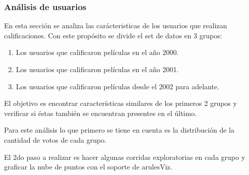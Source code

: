 \documentclass[journal]{IEEEtran}
\begin{document}
\subsubsection{Análisis de usuarios}
En esta sección se analiza las carácteristicas de los usuarios que realizan
calificaciones. Con este propósito se divide el set de datos en 3 grupos:
\begin{enumerate}
\item Los usuarios que calificaron películas en el año 2000.
\item Los usuarios que calificaron películas en el año 2001.
\item Los usuarios que calificaron películas desde el 2002 para adelante.
\end{enumerate}
El objetivo es encontrar características similares de los primeros 2 grupos
y verificar si éstas también se encuentran presentes en el último.

Para este análisis lo que primero se tiene en cuenta es la distribución
de la cantidad de votos de cada grupo.

El 2do paso a realizar es hacer algunas corridas exploratorias en cada
grupo y graficar la nube de puntos con el soporte de arulesViz. 
\end{document}
